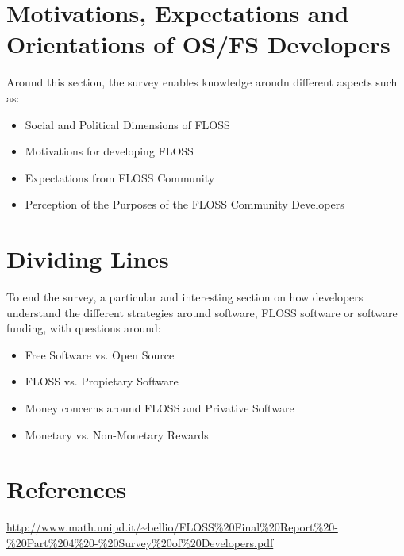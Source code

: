 \documentclass[11pt]{article}
\begin{document}
\section{Motivations, Expectations and Orientations of OS/FS Developers}
Around this section, the survey enables knowledge aroudn different aspects such as:
\begin{itemize}\itemsep0pt
\item{Social and Political Dimensions of FLOSS}
\item{Motivations for developing FLOSS}
\item{Expectations from FLOSS Community}
\item{Perception of the Purposes of the FLOSS Community Developers
}
\end{itemize}

\section{Dividing Lines}
To end the survey, a particular and interesting section on how developers understand the different strategies around software, FLOSS software or software funding, with questions around:
\begin{itemize}\itemsep0pt
\item{Free Software vs. Open Source}
\item{FLOSS vs. Propietary Software}
\item{Money concerns around FLOSS and Privative Software}
\item{Monetary vs. Non-Monetary Rewards}
\end{itemize}

\section{References}
\url{http://www.math.unipd.it/~bellio/FLOSS%20Final%20Report%20-%20Part%204%20-%20Survey%20of%20Developers.pdf}
\end{document}
